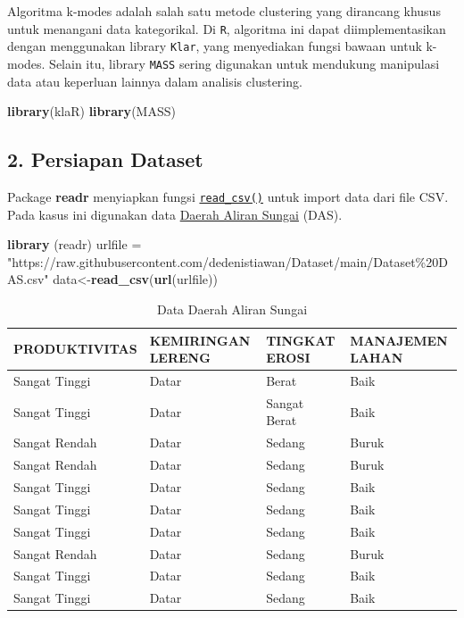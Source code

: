 \documentclass[
  oneside]{book}
\newenvironment{Shaded}{\begin{snugshade}}{\end{snugshade}}
\newcommand{\FunctionTok}[1]{\textcolor[rgb]{0.13,0.29,0.53}{\textbf{#1}}}
\newcommand{\NormalTok}[1]{#1}
\newcommand{\OtherTok}[1]{\textcolor[rgb]{0.56,0.35,0.01}{#1}}
\newcommand{\StringTok}[1]{\textcolor[rgb]{0.31,0.60,0.02}{#1}}
\begin{document}
Algoritma k-modes adalah salah satu metode clustering yang dirancang khusus untuk menangani data kategorikal. Di \texttt{R}, algoritma ini dapat diimplementasikan dengan menggunakan library \texttt{Klar}, yang menyediakan fungsi bawaan untuk k-modes. Selain itu, library \texttt{MASS} sering digunakan untuk mendukung manipulasi data atau keperluan lainnya dalam analisis clustering.

\begin{Shaded}
\begin{Highlighting}[]
\FunctionTok{library}\NormalTok{(klaR)}
\FunctionTok{library}\NormalTok{(MASS)}
\end{Highlighting}
\end{Shaded}

\subsection*{2. Persiapan Dataset}\label{persiapan-dataset}

Package \textbf{readr} menyiapkan fungsi \href{https://readr.tidyverse.org/reference/read_delim.html}{\texttt{read\_csv()}} untuk import data dari file CSV. Pada kasus ini digunakan data \href{https://github.com/dedenistiawan/dataset}{Daerah Aliran Sungai} (DAS).

\begin{Shaded}
\begin{Highlighting}[]
\FunctionTok{library}\NormalTok{ (readr)}
\NormalTok{urlfile }\OtherTok{=} \StringTok{"https://raw.githubusercontent.com/dedenistiawan/Dataset/main/Dataset\%20DAS.csv"}
\NormalTok{data}\OtherTok{\textless{}{-}}\FunctionTok{read\_csv}\NormalTok{(}\FunctionTok{url}\NormalTok{(urlfile))}
\end{Highlighting}
\end{Shaded}

\begin{table}

\caption{\label{tab:nice-tab-1}Data Daerah Aliran Sungai}
\centering
\begin{tabular}[t]{llll}
\toprule
PRODUKTIVITAS & KEMIRINGAN LERENG & TINGKAT EROSI & MANAJEMEN LAHAN\\
\midrule
Sangat Tinggi & Datar & Berat & Baik\\
Sangat Tinggi & Datar & Sangat Berat & Baik\\
Sangat Rendah & Datar & Sedang & Buruk\\
Sangat Rendah & Datar & Sedang & Buruk\\
Sangat Tinggi & Datar & Sedang & Baik\\
\addlinespace
Sangat Tinggi & Datar & Sedang & Baik\\
Sangat Tinggi & Datar & Sedang & Baik\\
Sangat Rendah & Datar & Sedang & Buruk\\
Sangat Tinggi & Datar & Sedang & Baik\\
Sangat Tinggi & Datar & Sedang & Baik\\
\bottomrule
\end{tabular}
\end{table}
\end{document}
